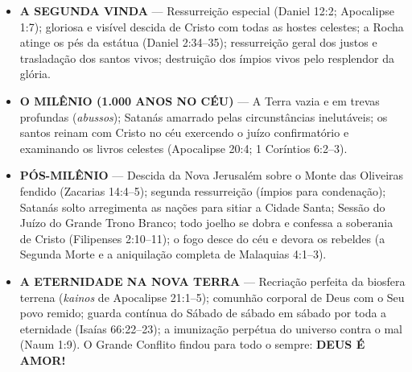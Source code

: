\documentclass[11pt,a4paper,openany]{book}
\begin{document}
\begin{itemize}
    \item \textbf{A SEGUNDA VINDA} --- Ressurreição especial (Daniel 12:2; Apocalipse 1:7); gloriosa e visível descida de Cristo com todas as hostes celestes; a Rocha atinge os pés da estátua (Daniel 2:34--35); ressurreição geral dos justos e trasladação dos santos vivos; destruição dos ímpios vivos pelo resplendor da glória.
    \item \textbf{O MILÊNIO (1.000 ANOS NO CÉU)} --- A Terra vazia e em trevas profundas (\textit{abussos}); Satanás amarrado pelas circunstâncias inelutáveis; os santos reinam com Cristo no céu exercendo o juízo confirmatório e examinando os livros celestes (Apocalipse 20:4; 1 Coríntios 6:2--3).
    \item \textbf{PÓS-MILÊNIO} --- Descida da Nova Jerusalém sobre o Monte das Oliveiras fendido (Zacarias 14:4--5); segunda ressurreição (ímpios para condenação); Satanás solto arregimenta as nações para sitiar a Cidade Santa; Sessão do Juízo do Grande Trono Branco; todo joelho se dobra e confessa a soberania de Cristo (Filipenses 2:10--11); o fogo desce do céu e devora os rebeldes (a Segunda Morte e a aniquilação completa de Malaquias 4:1--3).
    \item \textbf{A ETERNIDADE NA NOVA TERRA} --- Recriação perfeita da biosfera terrena (\textit{kainos} de Apocalipse 21:1--5); comunhão corporal de Deus com o Seu povo remido; guarda contínua do Sábado de sábado em sábado por toda a eternidade (Isaías 66:22--23); a imunização perpétua do universo contra o mal (Naum 1:9). O Grande Conflito findou para todo o sempre: \textbf{DEUS É AMOR!}
\end{itemize}
\end{document}
